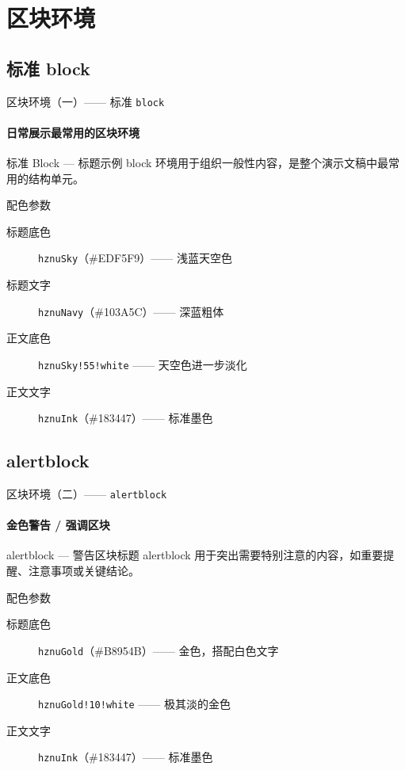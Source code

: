 \documentclass[10pt,aspectratio=169]{beamer}
\begin{document}
\section{区块环境}
\subsection{标准 block}
\begin{frame}{区块环境（一）—— 标准 \texttt{block}}
  \framesubtitle{日常展示最常用的区块环境}

  \begin{block}{标准 Block — 标题示例}
    block 环境用于组织一般性内容，是整个演示文稿中最常用的结构单元。
  \end{block}

  \vspace{.3cm}
  \begin{block}{配色参数}
    \begin{description}
      \item[标题底色] \texttt{hznuSky}（\#EDF5F9）—— 浅蓝天空色
      \item[标题文字] \texttt{hznuNavy}（\#103A5C）—— 深蓝粗体
      \item[正文底色] \texttt{hznuSky!55!white} —— 天空色进一步淡化
      \item[正文文字] \texttt{hznuInk}（\#183447）—— 标准墨色
    \end{description}
  \end{block}
\end{frame}

\subsection{alertblock}
\begin{frame}{区块环境（二）—— \texttt{alertblock}}
  \framesubtitle{金色警告 / 强调区块}

  \begin{alertblock}{alertblock — 警告区块标题}
    alertblock 用于突出需要特别注意的内容，如重要提醒、注意事项或关键结论。
  \end{alertblock}

  \vspace{.3cm}
  \begin{block}{配色参数}
    \begin{description}
      \item[标题底色] \texttt{hznuGold}（\#B8954B）—— 金色，搭配白色文字
      \item[正文底色] \texttt{hznuGold!10!white} —— 极其淡的金色
      \item[正文文字] \texttt{hznuInk}（\#183447）—— 标准墨色
    \end{description}
  \end{block}


\end{frame}
\end{document}
